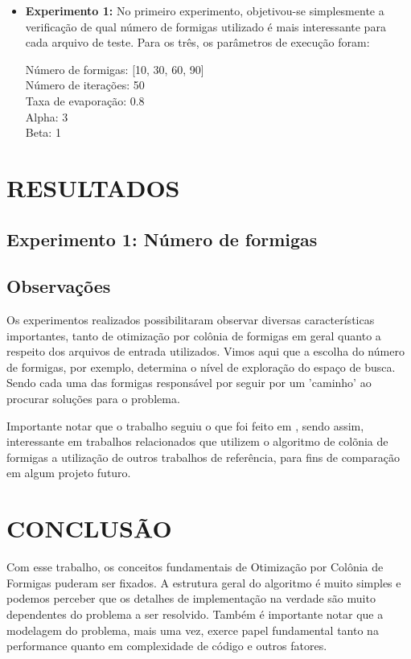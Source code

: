 \documentclass[12pt]{article}
\begin{document}
\begin{itemize}
 \item \textbf{Experimento 1:} No primeiro experimento, objetivou-se simplesmente a verificação
 de qual número de formigas utilizado é mais interessante para cada arquivo de teste. Para os
 três, os parâmetros de execução foram:
 
 Número de formigas: [10, 30, 60, 90] \\
 Número de iterações: 50 \\
 Taxa de evaporação: 0.8 \\
 Alpha: 3 \\
 Beta: 1
 
\end{itemize}

\section{RESULTADOS} \label{sec:result}

\subsection{Experimento 1: Número de formigas}

\subsection{Observações}

Os experimentos realizados possibilitaram observar diversas características importantes, tanto
de otimização por colônia de formigas em geral quanto a respeito dos arquivos de entrada utilizados.
Vimos aqui que a escolha do número de formigas, por exemplo, determina o nível de exploração
do espaço de busca. Sendo cada uma das formigas responsável por seguir por um 'caminho' ao procurar
soluções para o problema.

Importante notar que o trabalho seguiu o que foi feito em \cite{DBLP:journals/informaticaSI/FrancaZC05},
sendo assim, interessante em trabalhos relacionados que utilizem o algoritmo de colõnia de formigas a
utilização de outros trabalhos de referência, para fins de comparação em algum projeto futuro.

\section{CONCLUSÃO}

Com esse trabalho, os conceitos fundamentais de Otimização por Colônia de Formigas puderam ser
fixados. A estrutura geral do algoritmo é muito simples e podemos perceber que os detalhes de
implementação na verdade são muito dependentes do problema a ser resolvido. Também é importante
notar que a modelagem do problema, mais uma vez, exerce papel fundamental tanto na performance
quanto em complexidade de código e outros fatores.
\end{document}
